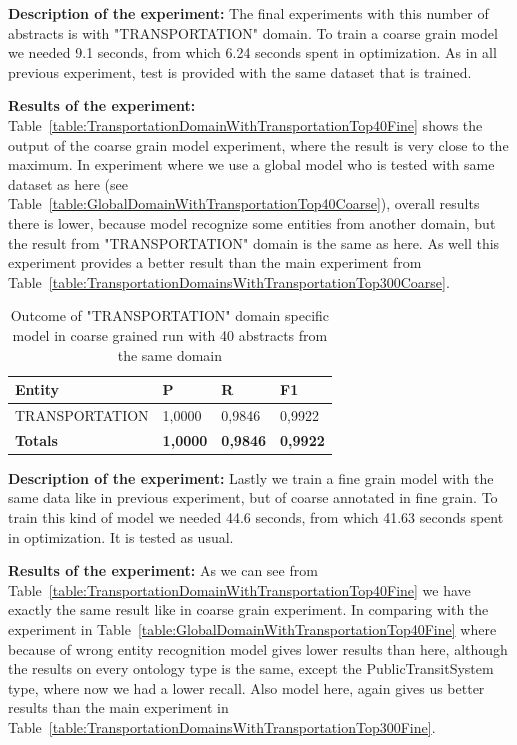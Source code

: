 \documentclass[thesis=M,english]{FITthesis}[2018/05/30]
\begin{document}

	\textbf{Description of the experiment:} The final experiments with this number of abstracts is with "TRANSPORTATION" domain. To train a coarse grain model we needed 9.1 seconds, from which 6.24 seconds spent in optimization. As in all previous experiment, test is provided with the same dataset that is trained.

	\textbf{Results of the experiment:} Table~\ref{table:TransportationDomainWithTransportationTop40Fine} shows the output of the coarse grain model experiment, where the result is very close to the maximum. In experiment where we use a global model who is tested with same dataset as here (see Table~\ref{table:GlobalDomainWithTransportationTop40Coarse}), overall results there is lower, because model recognize some entities from another domain, but the result from "TRANSPORTATION" domain is the same as here. As well this experiment provides a better result than the main experiment from Table~\ref{table:TransportationDomainsWithTransportationTop300Coarse}.  
	
	\begin{table}[H]\centering
		\begin{tabular}{|l|l|l|l|}
			\hline {\textbf{Entity}} & {\textbf{P}} & {\textbf{R}} & {\textbf{F1}}\\\hline
				TRANSPORTATION & 1,0000 & 0,9846 & 0,9922\\\hline
				\textbf{Totals} & \textbf{1,0000} & \textbf{0,9846} & \textbf{0,9922}\\\hline
		\end{tabular}
		\caption{Outcome of "TRANSPORTATION" domain specific model in coarse grained run with 40 abstracts from the same domain \label{table:TransportationDomainWithTransportationTop40Coarse}}
	\end{table}	

	\textbf{Description of the experiment:} Lastly we train a fine grain model with the same data like in previous experiment, but of coarse annotated in fine grain. To train this kind of model we needed 44.6 seconds, from which 41.63 seconds spent in optimization. It is tested as usual.
	 

	\textbf{Results of the experiment:} As we can see from Table~\ref{table:TransportationDomainWithTransportationTop40Fine} we have exactly the same result like in coarse grain experiment. In comparing with the experiment in Table~\ref{table:GlobalDomainWithTransportationTop40Fine} where because of wrong entity recognition model gives lower results than here, although the results on every ontology type is the same, except the PublicTransitSystem type, where now we had a lower recall. Also model here, again gives us better results than the main experiment in Table~\ref{table:TransportationDomainsWithTransportationTop300Fine}. 
\end{document}
